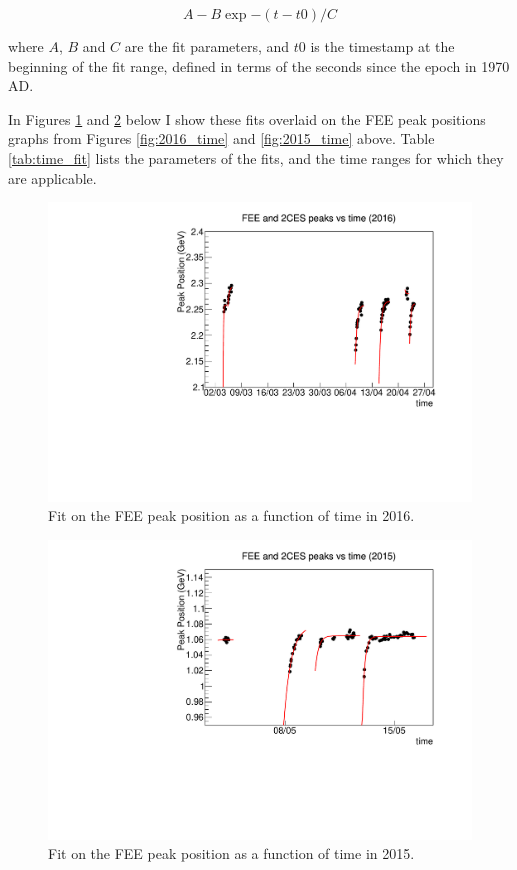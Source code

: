 \documentclass[11pt]{article}
\begin{document}
\begin{equation}
A - B \exp{-(t-t0)/C}
\label{eq:expo}
\end{equation}
 
where $A$, $B$ and $C$ are the fit parameters, and $t0$ is the timestamp at the beginning of the fit range, defined in terms of the seconds since the epoch in 1970 AD.  
 
In Figures \ref{fig:2016_time_fit} and
 \ref{fig:2015_time_fit} below I show these fits overlaid on the FEE peak positions graphs from Figures
  \ref{fig:2016_time} and
   \ref{fig:2015_time} above.  Table \ref{tab:time_fit} lists the parameters of the fits, and the time ranges for which they are applicable.



\begin{figure}[htbp] 
\begin{center}
\includegraphics[width =  .9\textwidth]{figures/2016_time_fit.pdf}
\caption{Fit on the FEE peak position as a function of time in 2016.}
\label{fig:2016_time_fit} 
\end{center}
\end{figure}

\begin{figure}[htbp] 
\begin{center}
\includegraphics[width =  .9\textwidth]{figures/2015_time_fit.pdf}
\caption{Fit on the FEE peak position as a function of time in 2015.} 
\label{fig:2015_time_fit}
\end{center}
\end{figure}
\end{document}
